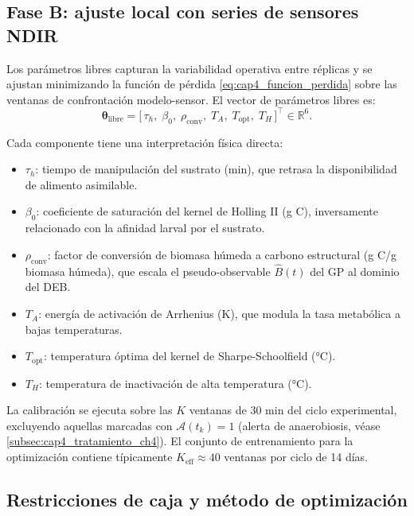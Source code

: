\subsection{Fase B: ajuste local con series de sensores NDIR}
\label{subsec:cap4_fase_b}

Los parámetros libres capturan la variabilidad operativa entre réplicas y se ajustan minimizando la función de pérdida \eqref{eq:cap4_funcion_perdida} sobre las ventanas de confrontación modelo-sensor. El vector de parámetros libres es:
\begin{equation}
    \label{eq:cap4_parametros_libres}
    \boldsymbol{\theta}_{\mathrm{libre}} =
    \bigl[\,\tau_h,\; \beta_0,\; \rho_{\mathrm{conv}},\; T_A,\; T_{\mathrm{opt}},\; T_H\,\bigr]^\intercal
    \in \mathbb{R}^{6}.
\end{equation}

Cada componente tiene una interpretación física directa:
\begin{itemize}
    \item $\tau_h$: tiempo de manipulación del sustrato (min), que retrasa la disponibilidad de alimento asimilable.
    \item $\beta_0$: coeficiente de saturación del kernel de Holling II (g C), inversamente relacionado con la afinidad larval por el sustrato.
    \item $\rho_{\mathrm{conv}}$: factor de conversión de biomasa húmeda a carbono estructural (g C/g biomasa húmeda), que escala el pseudo-observable $\hat{B}(t)$ del GP al dominio del DEB.
    \item $T_A$: energía de activación de Arrhenius (K), que modula la tasa metabólica a bajas temperaturas.
    \item $T_{\mathrm{opt}}$: temperatura óptima del kernel de Sharpe-Schoolfield (°C).
    \item $T_H$: temperatura de inactivación de alta temperatura (°C).
\end{itemize}

La calibración se ejecuta sobre las $K$ ventanas de \num{30} min del ciclo experimental, excluyendo aquellas marcadas con $\mathcal{A}(t_k) = 1$ (alerta de anaerobiosis, véase \cref{subsec:cap4_tratamiento_ch4}). El conjunto de entrenamiento para la optimización contiene típicamente $K_{\mathrm{eff}} \approx \num{40}$ ventanas por ciclo de \num{14} días.

\subsection{Restricciones de caja y método de optimización}
\label{subsec:cap4_restricciones}

